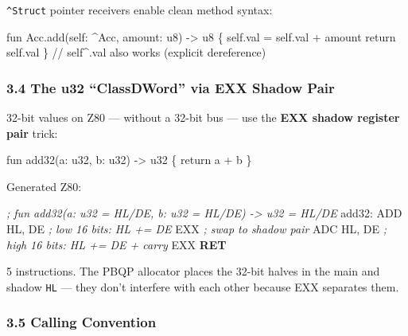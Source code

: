 \documentclass[
  11pt,
]{article}
\newenvironment{Shaded}{}{}
\newcommand{\BuiltInTok}[1]{\textcolor[rgb]{0.00,0.50,0.00}{#1}}
\newcommand{\CommentTok}[1]{\textcolor[rgb]{0.38,0.63,0.69}{\textit{#1}}}
\newcommand{\ControlFlowTok}[1]{\textcolor[rgb]{0.00,0.44,0.13}{\textbf{#1}}}
\newcommand{\FunctionTok}[1]{\textcolor[rgb]{0.02,0.16,0.49}{#1}}
\newcommand{\NormalTok}[1]{#1}
\newcommand{\OperatorTok}[1]{\textcolor[rgb]{0.40,0.40,0.40}{#1}}
\begin{document}
\texttt{\^{}Struct} pointer receivers enable clean method syntax:

\begin{Shaded}
\begin{Highlighting}[]
\NormalTok{fun Acc.add(self: \^{}Acc, amount: u8) {-}\textgreater{} u8 \{}
\NormalTok{    self.val = self.val + amount}
\NormalTok{    return self.val}
\NormalTok{\}}
\NormalTok{// self\^{}.val also works (explicit dereference)}
\end{Highlighting}
\end{Shaded}

\subsubsection{3.4 The u32 ``ClassDWord'' via EXX Shadow
Pair}\label{the-u32-classdword-via-exx-shadow-pair}

32-bit values on Z80 --- without a 32-bit bus --- use the \textbf{EXX
shadow register pair} trick:

\begin{Shaded}
\begin{Highlighting}[]
\NormalTok{fun add32(a: u32, b: u32) {-}\textgreater{} u32 \{ return a + b \}}
\end{Highlighting}
\end{Shaded}

Generated Z80:

\begin{Shaded}
\begin{Highlighting}[]
\CommentTok{; fun add32(a: u32 = HL/DE\textquotesingle{}, b: u32 = HL\textquotesingle{}/DE) {-}\textgreater{} u32 = HL/DE}
\FunctionTok{add32:}
    \BuiltInTok{ADD}\NormalTok{ HL}\OperatorTok{,}\NormalTok{ DE      }\CommentTok{; low 16 bits: HL += DE}
\NormalTok{    EXX             }\CommentTok{; swap to shadow pair}
    \BuiltInTok{ADC}\NormalTok{ HL}\OperatorTok{,}\NormalTok{ DE      }\CommentTok{; high 16 bits: HL\textquotesingle{} += DE\textquotesingle{} + carry}
\NormalTok{    EXX}
    \ControlFlowTok{RET}
\end{Highlighting}
\end{Shaded}

5 instructions. The PBQP allocator places the 32-bit halves in the main
and shadow \texttt{HL} --- they don't interfere with each other because
EXX separates them.

\subsubsection{3.5 Calling Convention}\label{calling-convention}
\end{document}
